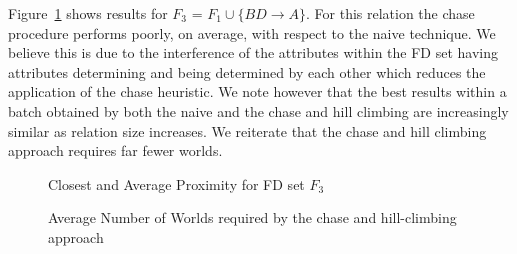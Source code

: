 Figure~\ref{graph:4.2} shows results for
$F_3$ = $F_1 \cup \{ BD \to A \}$. For this relation
the chase procedure performs poorly, on average, with respect to the
naive technique. We believe this is due to the interference of the attributes
within the FD set having attributes determining and being determined by
each other which reduces the application of the chase heuristic.
 We note however that the best results within a batch obtained by both
the naive and the chase and hill climbing are increasingly similar as
relation size increases. We reiterate that the chase and hill climbing
approach requires far fewer worlds.

\begin{figure}
\centerline{}
\caption{\label{graph:4.2} {Closest and Average Proximity for FD set $F_3$  }}
\end{figure}

\begin{figure}
\centerline{}
\caption{\label{graph:4.3} {Average Number of Worlds required by
the chase and hill-climbing approach}}
\end{figure}

